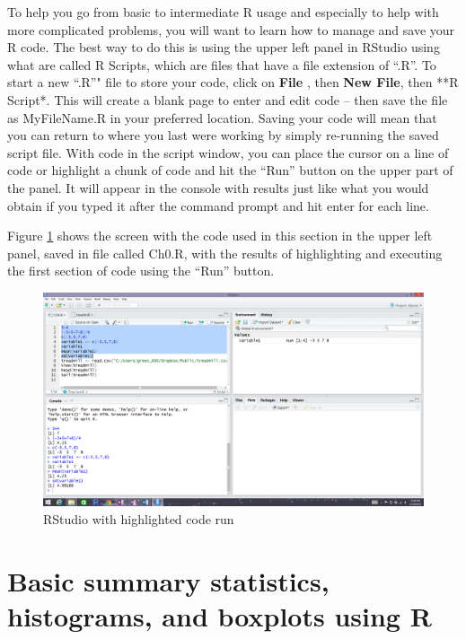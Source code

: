 \documentclass[]{book}
\begin{document}
To help you go from basic to intermediate R usage and especially to help
with more complicated problems, you will want to learn how to manage and
save your R code. The best way to do this is using the upper left panel
in RStudio using what are called R Scripts, which are files that have a
file extension of ``.R''. To start a new ``.R''" file to store your
code, click on \textbf{File} , then \textbf{New File}, then **R Script*.
This will create a blank page to enter and edit code -- then save the
file as MyFileName.R in your preferred location. Saving your code will
mean that you can return to where you last were working by simply
re-running the saved script file. With code in the script window, you
can place the cursor on a line of code or highlight a chunk of code and
hit the ``Run'' button on the upper part of the panel. It will appear in
the console with results just like what you would obtain if you typed it
after the command prompt and hit enter for each line.

Figure \ref{fig:Figure4} shows the screen with the code used in this
section in the upper left panel, saved in file called Ch0.R, with the
results of highlighting and executing the first section of code using
the ``Run'' button.



\begin{figure}
\includegraphics[width=26.67in]{chapter0_files/image006} \caption{RStudio with highlighted code run}\label{fig:Figure4}
\end{figure}

\section{Basic summary statistics, histograms, and boxplots using
R}\label{basic-summary-statistics-histograms-and-boxplots-using-r}
\end{document}
